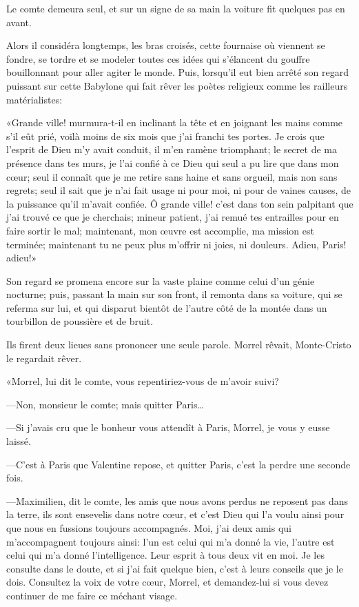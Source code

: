 Le comte demeura seul, et sur un signe de sa main la voiture fit quelques pas en avant. 

Alors il considéra longtemps, les bras croisés, cette fournaise où viennent se fondre, se tordre et se modeler toutes ces idées qui s'élancent du gouffre bouillonnant pour aller agiter le monde. Puis, lorsqu'il eut bien arrêté son regard puissant sur cette Babylone qui fait rêver les poètes religieux comme les railleurs matérialistes: 

«Grande ville! murmura-t-il en inclinant la tête et en joignant les mains comme s'il eût prié, voilà moins de six mois que j'ai franchi tes portes. Je crois que l'esprit de Dieu m'y avait conduit, il m'en ramène triomphant; le secret de ma présence dans tes murs, je l'ai confié à ce Dieu qui seul a pu lire que dans mon cœur; seul il connaît que je me retire sans haine et sans orgueil, mais non sans regrets; seul il sait que je n'ai fait usage ni pour moi, ni pour de vaines causes, de la puissance qu'il m'avait confiée. Ô grande ville! c'est dans ton sein palpitant que j'ai trouvé ce que je cherchais; mineur patient, j'ai remué tes entrailles pour en faire sortir le mal; maintenant, mon œuvre est accomplie, ma mission est terminée; maintenant tu ne peux plus m'offrir ni joies, ni douleurs. Adieu, Paris! adieu!» 

Son regard se promena encore sur la vaste plaine comme celui d'un génie nocturne; puis, passant la main sur son front, il remonta dans sa voiture, qui se referma sur lui, et qui disparut bientôt de l'autre côté de la montée dans un tourbillon de poussière et de bruit. 

Ils firent deux lieues sans prononcer une seule parole. Morrel rêvait, Monte-Cristo le regardait rêver. 

«Morrel, lui dit le comte, vous repentiriez-vous de m'avoir suivi? 

—Non, monsieur le comte; mais quitter Paris\dots 

—Si j'avais cru que le bonheur vous attendît à Paris, Morrel, je vous y eusse laissé. 

—C'est à Paris que Valentine repose, et quitter Paris, c'est la perdre une seconde fois. 

—Maximilien, dit le comte, les amis que nous avons perdus ne reposent pas dans la terre, ils sont ensevelis dans notre cœur, et c'est Dieu qui l'a voulu ainsi pour que nous en fussions toujours accompagnés. Moi, j'ai deux amis qui m'accompagnent toujours ainsi: l'un est celui qui m'a donné la vie, l'autre est celui qui m'a donné l'intelligence. Leur esprit à tous deux vit en moi. Je les consulte dans le doute, et si j'ai fait quelque bien, c'est à leurs conseils que je le dois. Consultez la voix de votre cœur, Morrel, et demandez-lui si vous devez continuer de me faire ce méchant visage. 

